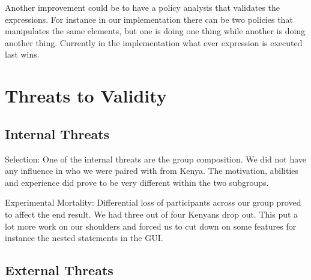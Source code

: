 Another improvement could be to have a policy analysis that validates the expressions. For instance in our implementation there can be two policies that manipulates the same elements, but one is doing one thing while another is doing another thing. Currently in the implementation what ever expression is executed last wins.

\section{Threats to Validity}\label{subsec:threatstovalidity}

\subsection{Internal Threats}
Selection: One of the internal threats are the group composition. We did not have any influence in who we were paired with from Kenya. The motivation, abilities and experience did prove to be very different within the two subgroups.

Experimental Mortality: Differential loss of participants across our group proved to affect the end result. We had three out of four Kenyans drop out. This put a lot more work on our shoulders and forced us to cut down on some features for instance the nested statements in the GUI.

\subsection{External Threats}


